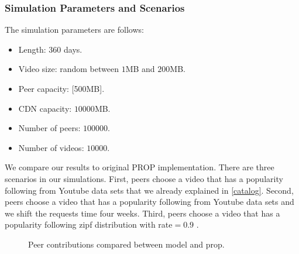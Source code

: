 \documentclass[10pt,final,journal,a4paper]{IEEEtran}
\begin{document}
\subsubsection{Simulation Parameters and Scenarios}
The simulation parameters are follows:
\begin{itemize}
\item Length: $360$ days.
\item Video size: random between $1$MB and $200$MB.
\item Peer capacity: [500MB].
\item CDN capacity: $10000$MB.
\item Number of peers: $100000$.
\item Number of videos: $10000$.
\end{itemize}
We compare our results to original PROP \cite{1613869} implementation.
There are three scenarios in our simulations.
First, peers choose a video that has a popularity following from Youtube data sets that we already explained in \ref{catalog}.
Second, peers choose a video that has a popularity following from Youtube data sets and we shift the requests time four weeks.
Third, peers choose a video that has a popularity following zipf distribution with rate$=0.9$ \cite{6654887}.





\begin{figure}[!t]
\centering
{}
\hfill
{}
\hfill
{}
\vspace{2mm}
\caption{Peer contributions compared between model and prop.}
\label{fig:peercontribution}
\end{figure}
\end{document}
